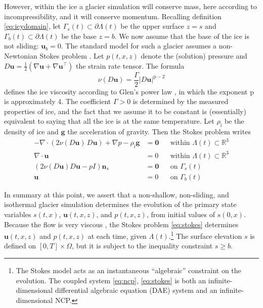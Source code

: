 \documentclass[hidelinks,onefignum,onetabnum,final]{siamart220329}  %
\newcommand{\RR}{\mathbb{R}}
\newcommand{\grad}{\nabla}
\newcommand{\bg}{\mathbf{g}}
\newcommand{\bn}{\mathbf{n}}
\newcommand{\bu}{\mathbf{u}}
\newcommand{\bzero}{\bm{0}}
\newcommand{\pp}{{\text{p}}}
\newcommand{\rhoi}{\rho_{\text{i}}}
\begin{document}
However, within the ice a glacier simulation will conserve mass, here according to incompressibility, and it will conserve momentum.  Recalling definition \eqref{eq:icydomain}, let $\Gamma_s(t) \subset \partial \Lambda(t)$ be the upper surface $z=s$ and
$\Gamma_b(t) \subset \partial \Lambda(t)$ be the base $z=b$.  We now assume that the base of the ice is not sliding: $\bu_b=0$.  The standard model for such a glacier assumes a non-Newtonian Stokes problem \cite{GreveBlatter2009}.  Let $p(t,x,z)$ denote the (solution) pressure and $D\bu=\frac{1}{2}(\grad \bu + \grad \bu^{\top})$ the strain rate tensor.  The formula
\begin{equation}
\nu(D\bu) = \frac{\Gamma}{2} |D\bu|^{\pp-2} \label{eq:glen}
\end{equation}
defines the ice viscosity according to Glen's power law \cite{GreveBlatter2009}, in which the exponent $\pp$ is approximately 4.  The coefficient $\Gamma>0$ is determined by the measured properties of ice, and the fact that we assume it to be constant is (essentially) equivalent to saying that all the ice is at the same temperature.  Let $\rhoi$ be the density of ice and $\bg$ the acceleration of gravity.  Then the Stokes problem writes
\begin{subequations}
\label{eq:stokes}
\begin{align}
- \nabla \cdot \left(2 \nu(D\bu)\, D\bu\right) + \nabla p - \rhoi \bg &= \bzero && \text{within $\Lambda(t) \subset \RR^3$} \\
\nabla \cdot \bu &= 0 && \text{within $\Lambda(t) \subset \RR^3$} \\
\left(2 \nu(D\bu) D\bu - pI\right) \bn_s &= \bzero && \text{on $\Gamma_s(t)$} \\
\bu  &= 0 && \text{on $\Gamma_b(t)$}
\end{align}
\end{subequations}

In summary at this point, we assert that a non-shallow, non-sliding, and isothermal glacier simulation determines the evolution of the primary state variables $s(t,x)$, $\bu(t,x,z)$, and $p(t,x,z)$, from initial values of $s(0,x)$.  Because the flow is very viscous \cite{Acheson1990}, the Stokes problem \eqref{eq:stokes} determines $\bu(t,x,z)$ and $p(t,x,z)$ at each time, given $\Lambda(t)$.\footnote{The Stokes model acts as an instantaneous ``algebraic'' constraint on the evolution.  The coupled system \eqref{eq:ncp}, \eqref{eq:stokes} is both an infinite-dimensional differential algebraic equation (DAE) system and an infinite-dimensional NCP.}  The surface elevation $s$ is defined on $[0,T]\times \Omega$, but it is subject to the inequality constraint $s\ge b$.
\end{document}
